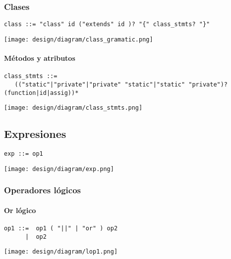 \subsubsection{Clases}
\begin{lstlisting}[style=nonumbers]
class ::= "class" id ("extends" id )? "{" class_stmts? "}"
\end{lstlisting}  	
\begin{center}
\texttt{[image: design/diagram/class\_gramatic.png]} 
\end{center}
\paragraph{Métodos y atributos}
\begin{lstlisting}[style=nonumbers]
class_stmts ::= 
   (("static"|"private"|"private" "static"|"static" "private")? (function|id|assig))*

\end{lstlisting}  	
\begin{center}
\texttt{[image: design/diagram/class\_stmts.png]} 
\end{center}
\subsection {Expresiones}
\begin{multicols}{2}
\begin{lstlisting}[style=nonumbers]      
exp ::= op1
\end{lstlisting}  
\columnbreak	
\begin{center}
\texttt{[image: design/diagram/exp.png]} 
\end{center}
\end{multicols}
\subsubsection{Operadores lógicos}
\paragraph{Or lógico}
\begin{multicols}{2}
\begin{lstlisting}[style=nonumbers]      
op1 ::=  op1 ( "||" | "or" ) op2
      |  op2
\end{lstlisting}  
\columnbreak	
\begin{center}
\texttt{[image: design/diagram/lop1.png]} 
\end{center}
\end{multicols}

